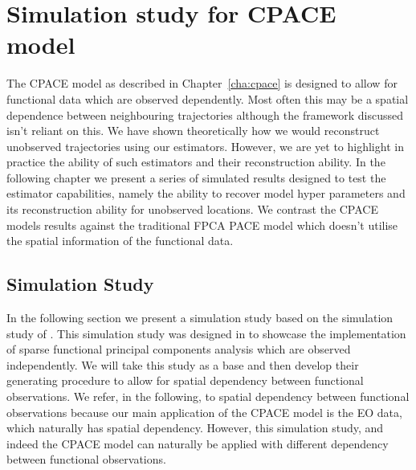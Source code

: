 
\chapter{Simulation study for  CPACE model \label{cha:application}}  %

\ifpdf
    \graphicspath{{Chapter6/Figs/Raster/}{Chapter6/Figs/PDF/}{Chapter6/Figs/}}
\else
    \graphicspath{{Chapter6/Figs/Vector/}{Chapter6/Figs/}}
\fi
The CPACE model as described in Chapter~\ref{cha:cpace} is designed to allow for functional data which are observed dependently.
Most often this may be a spatial dependence between neighbouring trajectories although the framework discussed isn't reliant on this.
We have shown theoretically how we would reconstruct unobserved trajectories using our estimators. 
However, we are yet to highlight in practice the ability of such estimators and their reconstruction ability.
In the following chapter we present a series of simulated results designed to test the estimator capabilities, namely the ability to recover model hyper parameters and its reconstruction ability for unobserved locations.
We contrast the CPACE models results against the traditional FPCA PACE model which doesn't utilise the spatial information of the functional data.

\section{Simulation Study \label{sec:sim_study}}
In the following section we present a simulation study based on the simulation study of \cite{yao_functional_2005}.
This simulation study was designed in \cite{yao_functional_2005} to showcase the implementation of sparse functional principal components analysis which are observed independently.
We will take this study as a base and then develop their generating procedure to allow for spatial dependency between functional observations.
We refer, in the following, to spatial dependency between functional observations because our main application of the CPACE model is the EO data, which naturally has spatial dependency.
However, this simulation study, and indeed the CPACE model can naturally be applied with different dependency between functional observations.


